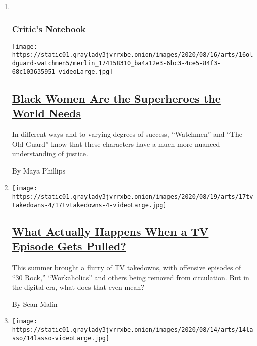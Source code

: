 \begin{enumerate}
\def\labelenumi{\arabic{enumi}.}
\item ~
  \hypertarget{critics-notebook-2}{%
  \subsubsection{Critic's Notebook}\label{critics-notebook-2}}

  \texttt{[image: https://static01.graylady3jvrrxbe.onion/images/2020/08/16/arts/16oldguard-watchmen5/merlin\_174158310\_ba4a12e3-6bc3-4ce5-84f3-68c103635951-videoLarge.jpg]}

  \hypertarget{black-women-are-the-superheroes-the-world-needs}{%
  \subsection{\texorpdfstring{\href{/2020/08/16/movies/oldguard-watchmen.html}{Black
  Women Are the Superheroes the World
  Needs}}{Black Women Are the Superheroes the World Needs}}\label{black-women-are-the-superheroes-the-world-needs}}

  In different ways and to varying degrees of success, ``Watchmen'' and
  ``The Old Guard'' know that these characters have a much more nuanced
  understanding of justice.

  By Maya Phillips
\item
  \texttt{[image: https://static01.graylady3jvrrxbe.onion/images/2020/08/19/arts/17tvtakedowns-4/17tvtakedowns-4-videoLarge.jpg]}

  \hypertarget{what-actually-happens-when-a-tv-episode-gets-pulled}{%
  \subsection{\texorpdfstring{\href{/2020/08/17/arts/television/pulled-episodes-blackface.html}{What
  Actually Happens When a TV Episode Gets
  Pulled?}}{What Actually Happens When a TV Episode Gets Pulled?}}\label{what-actually-happens-when-a-tv-episode-gets-pulled}}

  This summer brought a flurry of TV takedowns, with offensive episodes
  of ``30 Rock,'' ``Workaholics'' and others being removed from
  circulation. But in the digital era, what does that even mean?

  By Sean Malin
\item
  \texttt{[image: https://static01.graylady3jvrrxbe.onion/images/2020/08/14/arts/14lasso/14lasso-videoLarge.jpg]}


\end{enumerate}
